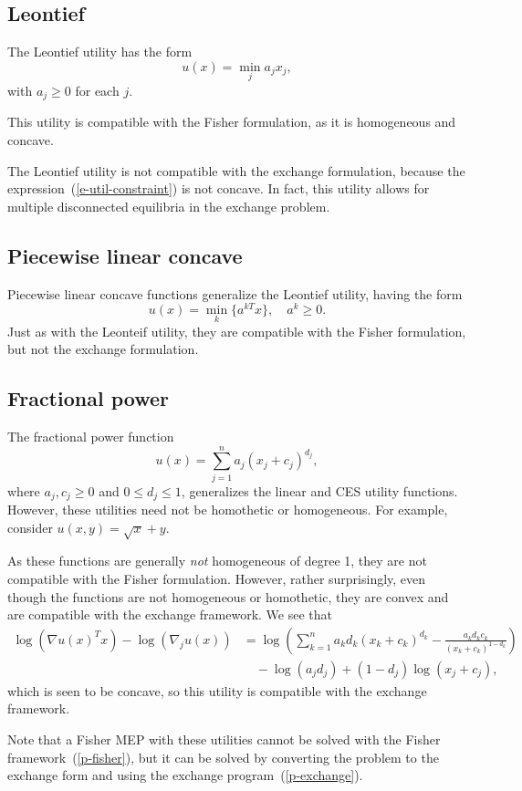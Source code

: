 \documentclass[12pt]{article}
\begin{document}
\subsection{Leontief}
The Leontief utility has the form
\[
u(x) = \min_j a_j x_j,
\]
with $a_j \geq 0$ for each $j$. 

This utility is compatible with the Fisher formulation, as it is homogeneous and concave.

The Leontief utility is not compatible with the exchange formulation,
because the expression~(\ref{e-util-constraint}) is not concave.
In fact, this utility allows for multiple disconnected equilibria in the exchange problem. %

\subsection{Piecewise linear concave}
Piecewise linear concave functions generalize the Leontief utility, having the form
\[
u(x) = \min_k\lbrace a^{kT}x \rbrace,\quad a^k \geq 0.
\]
Just as with the Leonteif utility, they are compatible with the Fisher
formulation, but not the exchange formulation.

\subsection{Fractional power}
The fractional power function
\[
u(x) = \sum_{j=1}^n a_j (x_j+ c_j)^{d_j},
\]
where $a_j, c_j \geq 0$ and $0 \leq d_j \leq 1$,
generalizes the linear and CES utility functions.
However, these utilities need not be homothetic or homogeneous.
For example, consider $u(x,y) = \sqrt{x} + y$.

As these functions are generally \emph{not} homogeneous of degree 1,
they are not compatible with the Fisher formulation.
However, rather surprisingly, even though the
functions are not homogeneous or homothetic, they are
convex and are compatible with the exchange framework.
We see that
\begin{align*}
\log(\nabla u(x)^T x) - \log(\nabla_j u(x))
&= \log\left(\sum_{k=1}^n a_k d_k (x_k+c_k)^{d_k} - \frac{a_k d_k c_k}{(x_k + c_k)^{1-d_k}} \right)\\
&\quad- \log(a_j d_j) + (1-d_j)\log (x_j + c_j),
\end{align*}
which is seen to be concave, so this utility is compatible with
the exchange framework.

Note that a Fisher MEP with these utilities cannot
be solved with the Fisher framework~(\ref{p-fisher}),
but it can be solved by converting the
problem to the exchange form and using the exchange program~(\ref{p-exchange}).
\end{document}
